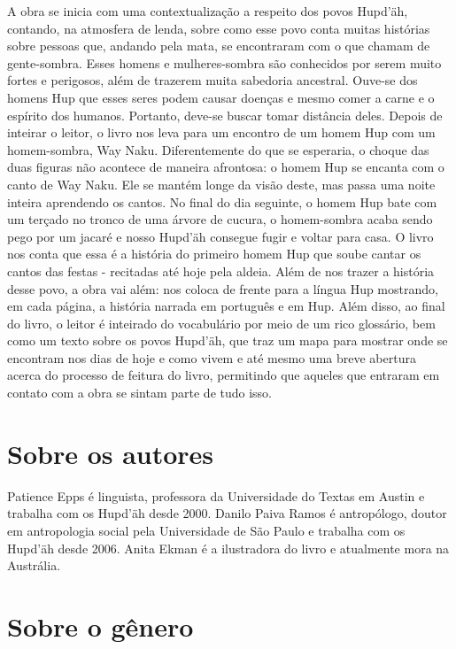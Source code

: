 \documentclass[11pt]{extarticle}
\begin{document}
A obra se inicia com uma contextualização a respeito dos povos Hupd'äh, contando, na atmosfera de lenda, sobre como esse povo conta muitas histórias sobre pessoas que, andando pela mata, se encontraram com o que chamam de gente-sombra. Esses homens e mulheres-sombra são conhecidos por serem muito fortes e perigosos, além de trazerem muita sabedoria ancestral. Ouve-se dos homens Hup que esses seres podem causar doenças e mesmo comer a carne e o espírito dos humanos. Portanto, deve-se buscar tomar distância deles. Depois de inteirar o leitor, o livro nos leva para um encontro de um homem Hup com um homem-sombra, Way Naku. Diferentemente do que se esperaria, o choque das duas figuras não acontece de maneira afrontosa: o homem Hup se encanta com o canto de Way Naku. Ele se mantém longe da visão deste, mas passa uma noite inteira aprendendo os cantos. No final do dia seguinte, o homem Hup bate com um terçado no tronco de uma árvore de cucura, o homem-sombra acaba sendo pego por um jacaré e nosso Hupd'äh consegue fugir e voltar para casa. O livro nos conta que essa é a história do primeiro homem Hup que soube cantar os cantos das festas - recitadas até hoje pela aldeia. Além de nos trazer a história desse povo, a obra vai além: nos coloca de frente para a língua Hup mostrando, em cada página, a história narrada em português e em Hup. Além disso, ao final do livro, o leitor é inteirado do vocabulário por meio de um rico glossário, bem como um texto sobre os povos Hupd'äh, que traz um mapa para mostrar onde se encontram nos dias de hoje e como vivem e até mesmo uma breve abertura acerca do processo de feitura do livro, permitindo que aqueles que entraram em contato com a obra se sintam parte de tudo isso.

\section{Sobre os autores}

Patience Epps é linguista, professora da Universidade do Textas em Austin e trabalha com os Hupd'äh desde 2000. Danilo Paiva Ramos é antropólogo, doutor em antropologia social pela Universidade de São Paulo e trabalha com os Hupd'äh desde 2006. Anita Ekman é a ilustradora do livro e atualmente mora na Austrália. 


\section{Sobre o gênero}
\end{document}
